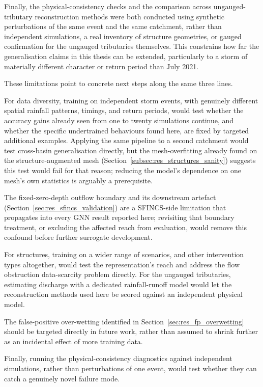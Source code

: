 \documentclass[12pt,a4paper]{report}
\begin{document}
{Finally, the physical-consistency checks and the comparison across ungauged-tributary reconstruction methods were both conducted using synthetic perturbations of the same event and the same catchment, rather than independent simulations, a real inventory of structure geometries, or gauged confirmation for the ungauged tributaries themselves. This constrains how far the generalisation claims in this thesis can be extended, particularly to a storm of materially different character or return period than July 2021.
 
These limitations point to concrete next steps along the same three lines.
 
For data diversity, training on independent storm events, with genuinely different spatial rainfall patterns, timings, and return periods, would test whether the accuracy gains already seen from one to twenty simulations continue, and whether the specific undertrained behaviours found here, are fixed by targeted additional examples. Applying the same pipeline to a second catchment would test cross-basin generalisation directly, but the mesh-overfitting already found on the structure-augmented mesh (Section~\ref{subsec:res_structures_sanity}) suggests this test would fail for that reason; reducing the model's dependence on one mesh's own statistics is arguably a prerequisite.
 
The fixed-zero-depth outflow boundary and its downstream artefact (Section~\ref{sec:res_sfincs_validation}) are a SFINCS-side limitation that propagates into every GNN result reported here; revisiting that boundary treatment, or excluding the affected reach from evaluation, would remove this confound before further surrogate development.
 
For structures, training on a wider range of scenarios, and other intervention types altogether, would test the representation's reach and address the flow obstruction data-scarcity problem directly. For the ungauged tributaries, estimating discharge with a dedicated rainfall-runoff model would let the reconstruction methods used here be scored against an independent physical model.
 
The false-positive over-wetting identified in Section~\ref{sec:res_fp_overwetting} should be targeted directly in future work, rather than assumed to shrink further as an incidental effect of more training data.

Finally, running the physical-consistency diagnostics against independent simulations, rather than perturbations of one event, would test whether they can catch a genuinely novel failure mode.

}
\end{document}
